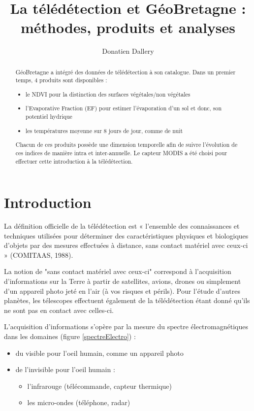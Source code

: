 \documentclass[10pt,a4paper]{article}
\author{Donatien Dallery}
\title{La télédétection et GéoBretagne : méthodes, produits et analyses}
\begin{document}
\maketitle

\begin{abstract}
GéoBretagne a intégré des données de télédétection à son catalogue. Dans un premier temps, 4 produits sont disponibles : 
\begin{itemize}
\item le NDVI pour la distinction des surfaces végétales/non végétales
\item l'Evaporative Fraction (EF) pour estimer l'évaporation d'un sol et donc, son potentiel hydrique
\item les températures moyenne sur 8 jours de jour, comme de nuit
\end{itemize}
Chacun de ces produits possède une dimension temporelle afin de suivre l'évolution de ces indices de manière intra et inter-annuelle. Le capteur MODIS a été choisi pour effectuer cette introduction à la télédétection.
\end{abstract}

\section{Introduction}

La définition officielle de la télédétection est « l’ensemble des connaissances et techniques utilisées pour déterminer des caractéristiques physiques et biologiques d’objets par des mesures effectuées à distance, sans contact matériel avec ceux-ci » (COMITAAS, 1988).\smallbreak

La notion de "sans contact matériel avec ceux-ci" correspond à l'acquisition d'informations sur la Terre à partir de satellites, avions, drones ou simplement d'un appareil photo jeté en l'air (à vos risques et périls). Pour l'étude d'autres planètes, les télescopes effectuent également de la télédétection étant donné qu'ils ne sont pas en contact avec celles-ci.\smallbreak

L'acquisition d'informations s'opère par la mesure du  spectre électromagnétiques dans les domaines (figure \ref{spectreElectro}) :
\begin{itemize}
\item du visible pour l'oeil humain, comme un appareil photo
\item de l'invisible pour l'oeil humain :
\begin{itemize}
\item l'infrarouge (télécommande, capteur thermique)
\item les micro-ondes (téléphone, radar)
\end{itemize}
\end{itemize}
\end{document}
